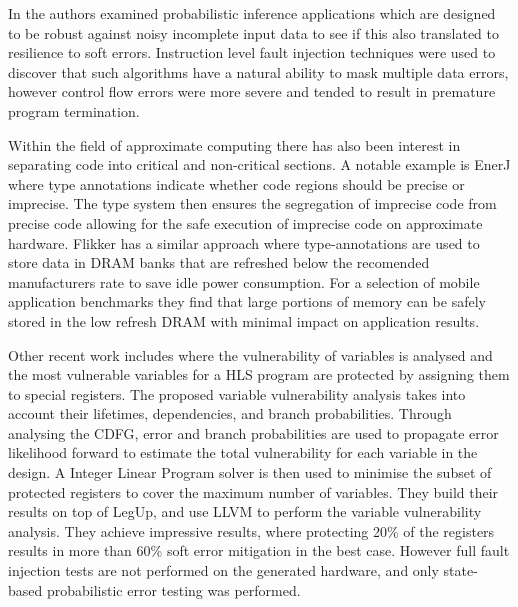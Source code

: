 In \cite{wong2006soft} the authors examined probabilistic
inference applications which are designed to be robust against noisy incomplete input
data to see if this also translated to resilience to soft errors.
Instruction level fault injection techniques were used to discover that such algorithms
have a natural ability to mask multiple data errors, however control flow errors were more
severe and tended to result in premature program termination.

Within the field of approximate computing there has also been interest in separating code into
critical and non-critical sections.  
A notable example is EnerJ \cite{sampson2011enerj} where type
annotations indicate whether code regions should be precise or imprecise.
The type system then ensures the segregation of imprecise code from precise code allowing for the safe execution of imprecise code on approximate hardware.
Flikker \cite{liu2012flikker} has a similar approach where type-annotations are used to store data in
DRAM banks that are refreshed below the recomended manufacturers rate to save idle power consumption.  
For a selection of mobile application benchmarks they find that large portions of memory can be safely
stored in the low refresh DRAM with minimal impact on application results.

Other recent work includes \cite{chen2014reliability} where the vulnerability of variables is analysed and the most vulnerable
variables for a HLS program are protected by assigning them to special registers.
The proposed variable vulnerability analysis takes into account their lifetimes, dependencies, and branch probabilities.
Through analysing the CDFG, error and branch probabilities are used to propagate error likelihood forward to estimate the total
vulnerability for each variable in the design.
A Integer Linear Program solver is then used to minimise the subset of protected registers to cover the maximum number of variables.
They build their results on top of LegUp, and use LLVM to perform the variable vulnerability analysis.
They achieve impressive results, where protecting 20\% of the registers results in more than 60\% soft error mitigation in the best case.
However full fault injection tests are not performed on the generated hardware, and only state-based probabilistic error testing
was performed.\\

